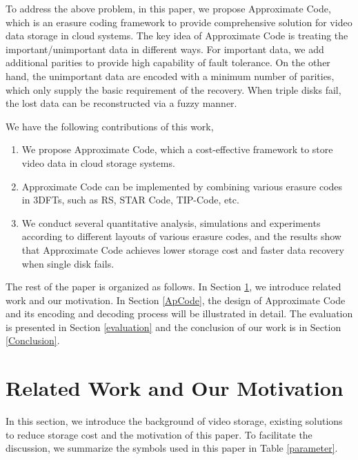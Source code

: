 \documentclass[sigconf]{acmart}
\begin{document}
To address the above problem, in this paper, we propose Approximate Code, which is an erasure coding framework to provide comprehensive solution for video data storage in cloud systems. The key idea of Approximate Code is treating the important/unimportant data in different ways. For important data, we add additional parities to provide high capability of fault tolerance. On the other hand, the unimportant data are encoded with a minimum number of parities, which only supply the basic requirement of the recovery. When triple disks fail, the lost data can be reconstructed via a fuzzy manner.

We have the following contributions of this work,
\begin{enumerate}
\item We propose Approximate Code, which a cost-effective framework to store video data in cloud storage systems.
\item Approximate Code can be implemented by combining various erasure codes in 3DFTs, such as RS, STAR Code, TIP-Code, etc.
\item We conduct several quantitative analysis, simulations and experiments according to different layouts of various erasure codes, and the results show that Approximate Code achieves lower storage cost and faster data recovery when single disk fails.
\end{enumerate}

The rest of the paper is organized as follows. In Section \ref{RelatedWork}, we introduce related work and our motivation.
In Section \ref{ApCode}, the design of Approximate Code and its encoding and decoding process will be illustrated in detail.
The evaluation is presented in Section \ref{evaluation} and the conclusion of our work is in Section \ref{Conclusion}.

\section{Related Work and Our Motivation}\label{RelatedWork}
In this section, we introduce the background of video storage, existing solutions to reduce storage cost and the motivation of this paper.
To facilitate the discussion, we summarize the symbols used in this paper in Table \ref{parameter}.
\end{document}
